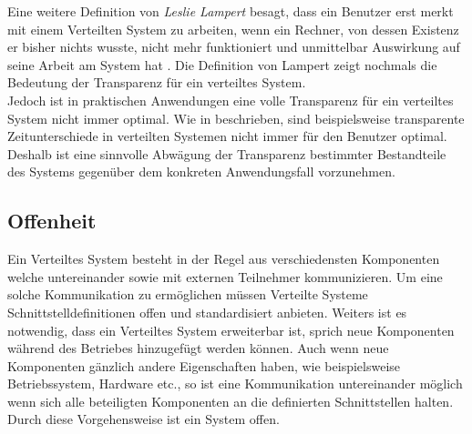 Eine weitere Definition von \textit{Leslie Lampert} besagt, dass ein Benutzer erst merkt mit einem Verteilten System zu arbeiten, wenn ein Rechner, von dessen Existenz er bisher nichts wusste, nicht mehr funktioniert und unmittelbar Auswirkung auf seine Arbeit am System hat \citep{Schroeder:1993}. Die Definition von Lampert zeigt nochmals die Bedeutung der Transparenz für ein verteiltes System. \\
Jedoch ist in praktischen Anwendungen eine volle Transparenz für ein verteiltes System nicht immer optimal. Wie in \cite{tanenbaum2007distributed} beschrieben, sind beispielsweise transparente Zeitunterschiede in verteilten Systemen nicht immer für den Benutzer optimal. Deshalb ist eine sinnvolle Abwägung der Transparenz bestimmter Bestandteile des Systems gegenüber dem konkreten Anwendungsfall vorzunehmen. 

\subsection{Offenheit}\label{sec:distributedSystems:goales:openness} 
Ein Verteiltes System besteht in der Regel aus verschiedensten Komponenten welche untereinander sowie mit externen Teilnehmer kommunizieren. Um eine solche Kommunikation zu ermöglichen müssen Verteilte Systeme Schnittstelldefinitionen offen und standardisiert anbieten. Weiters ist es notwendig, dass ein Verteiltes System erweiterbar ist, sprich neue Komponenten während des Betriebes hinzugefügt werden können. Auch wenn neue Komponenten gänzlich andere Eigenschaften haben, wie beispielsweise Betriebssystem, Hardware etc., so ist eine Kommunikation untereinander möglich wenn sich alle beteiligten Komponenten an die definierten Schnittstellen halten. Durch diese Vorgehensweise ist ein System offen.  
% 
% 
% 

